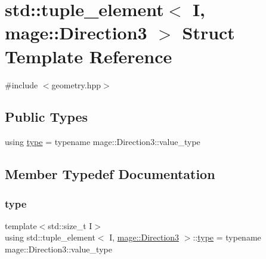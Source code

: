 \hypertarget{structstd_1_1tuple__element_3_01_i_00_01mage_1_1_direction3_01_4}{}\section{std\+:\+:tuple\+\_\+element$<$ I, mage\+:\+:Direction3 $>$ Struct Template Reference}
\label{structstd_1_1tuple__element_3_01_i_00_01mage_1_1_direction3_01_4}


{\ttfamily \#include $<$geometry.\+hpp$>$}

\subsection*{Public Types}
\begin{DoxyCompactItemize}
\item 
using \mbox{\hyperlink{structstd_1_1tuple__element_3_01_i_00_01mage_1_1_direction3_01_4_aba7f84e28b059beb0df838e74194efba}{type}} = typename mage\+::\+Direction3\+::value\+\_\+type
\end{DoxyCompactItemize}


\subsection{Member Typedef Documentation}
\mbox{\label{structstd_1_1tuple__element_3_01_i_00_01mage_1_1_direction3_01_4_aba7f84e28b059beb0df838e74194efba}} 
\subsubsection{\texorpdfstring{type}{type}}
{\footnotesize\ttfamily template$<$std\+::size\+\_\+t I$>$ \\
using std\+::tuple\+\_\+element$<$ I, \mbox{\hyperlink{structmage_1_1_direction3}{mage\+::\+Direction3}} $>$\+::\mbox{\hyperlink{structstd_1_1tuple__element_3_01_i_00_01mage_1_1_direction3_01_4_aba7f84e28b059beb0df838e74194efba}{type}} =  typename mage\+::\+Direction3\+::value\+\_\+type}

